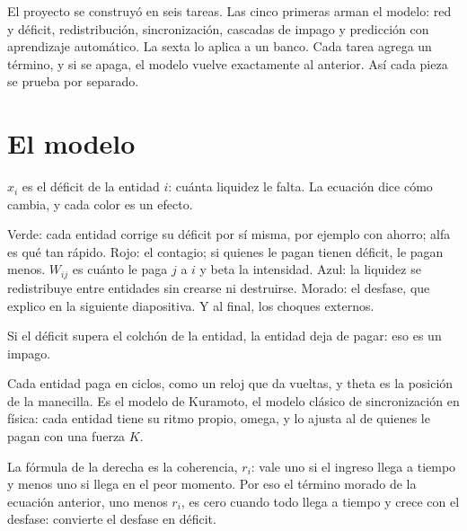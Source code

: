 \begin{decir}
El proyecto se construyó en seis tareas. Las cinco primeras arman el modelo: red y
déficit, redistribución, sincronización, cascadas de impago y predicción con aprendizaje
automático. La sexta lo aplica a un banco. Cada tarea agrega un término, y si se apaga,
el modelo vuelve exactamente al anterior. Así cada pieza se prueba por separado.
\end{decir}

\section{El modelo}

\begin{decir}
$x_i$ es el déficit de la entidad $i$: cuánta liquidez le falta. La ecuación dice cómo
cambia, y cada color es un efecto.

Verde: cada entidad corrige su déficit por sí misma, por ejemplo con ahorro; alfa es qué
tan rápido. Rojo: el contagio; si quienes le pagan tienen déficit, le pagan menos.
$W_{ij}$ es cuánto le paga $j$ a $i$ y beta la intensidad. Azul: la liquidez se
redistribuye entre entidades sin crearse ni destruirse. Morado: el desfase, que explico
en la siguiente diapositiva. Y al final, los choques externos.

Si el déficit supera el colchón de la entidad, la entidad deja de pagar: eso es un
impago.
\end{decir}

\begin{decir}
Cada entidad paga en ciclos, como un reloj que da vueltas, y theta es la posición de la
manecilla. Es el modelo de Kuramoto, el modelo clásico de sincronización en física: cada
entidad tiene su ritmo propio, omega, y lo ajusta al de quienes le pagan con una fuerza
$K$.

La fórmula de la derecha es la coherencia, $r_i$: vale uno si el ingreso llega a tiempo y
menos uno si llega en el peor momento. Por eso el término morado de la ecuación anterior,
uno menos $r_i$, es cero cuando todo llega a tiempo y crece con el desfase: convierte el
desfase en déficit.
\end{decir}

